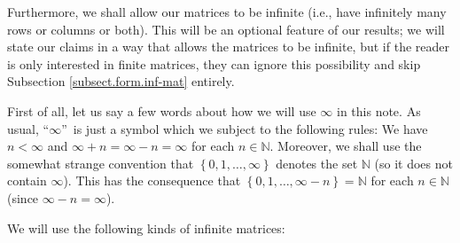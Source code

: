 \documentclass[numbers=enddot,12pt,final,onecolumn,notitlepage]{scrartcl}%
\theoremstyle{definition}
\begin{document}
Furthermore, we shall allow our matrices to be infinite (i.e., have infinitely
many rows or columns or both). This will be an optional feature of our
results; we will state our claims in a way that allows the matrices to be
infinite, but if the reader is only interested in finite matrices, they can
ignore this possibility and skip Subsection \ref{subsect.form.inf-mat} entirely.

First of all, let us say a few words about how we will use $\infty$ in this
note. As usual, \textquotedblleft$\infty$\textquotedblright\ is just a symbol
which we subject to the following rules: We have $n<\infty$ and $\infty
+n=\infty-n=\infty$ for each $n\in\mathbb{N}$. Moreover, we shall use the
somewhat strange convention that $\left\{  0,1,\ldots,\infty\right\}  $
denotes the set $\mathbb{N}$ (so it does not contain $\infty$). This has the
consequence that $\left\{  0,1,\ldots,\infty-n\right\}  =\mathbb{N}$ for each
$n\in\mathbb{N}$ (since $\infty-n=\infty$).

We will use the following kinds of infinite matrices:
\end{document}
